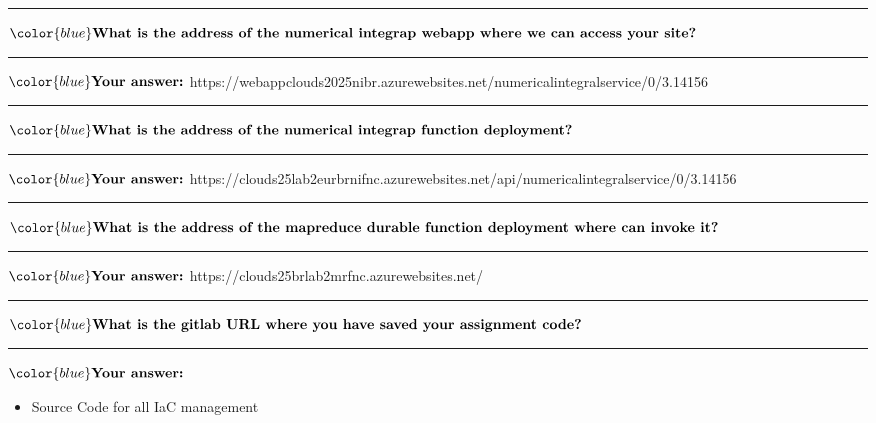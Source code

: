 \documentclass[11pt]{article}
\providecommand{\tightlist}{%
      \setlength{\itemsep}{0pt}\setlength{\parskip}{0pt}}
\begin{document}
    \begin{center}\rule{0.5\linewidth}{0.5pt}\end{center}

\(\color{blue}\textbf{What is the address of the numerical integrap webapp where we can access your site?}\)

\begin{center}\rule{0.5\linewidth}{0.5pt}\end{center}

\(\color{blue} \textbf{Your answer:}\)
https://webappclouds2025nibr.azurewebsites.net/numericalintegralservice/0/3.14156

\begin{center}\rule{0.5\linewidth}{0.5pt}\end{center}

\(\color{blue}\textbf{What is the address of the numerical integrap function deployment?}\)

\begin{center}\rule{0.5\linewidth}{0.5pt}\end{center}

\(\color{blue} \textbf{Your answer:}\)
https://clouds25lab2eurbrnifnc.azurewebsites.net/api/numericalintegralservice/0/3.14156

\begin{center}\rule{0.5\linewidth}{0.5pt}\end{center}

\(\color{blue}\textbf{What is the address of the mapreduce durable function deployment where can invoke it?}\)

\begin{center}\rule{0.5\linewidth}{0.5pt}\end{center}

\(\color{blue} \textbf{Your answer:}\)
https://clouds25brlab2mrfnc.azurewebsites.net/

\begin{center}\rule{0.5\linewidth}{0.5pt}\end{center}

\(\color{blue}\textbf{What is the gitlab URL where you have saved your assignment code?}\)

\begin{center}\rule{0.5\linewidth}{0.5pt}\end{center}

\(\color{blue} \textbf{Your answer:}\)

\begin{itemize}
\tightlist
\item
  Source Code for all IaC management
\end{itemize}
\end{document}
